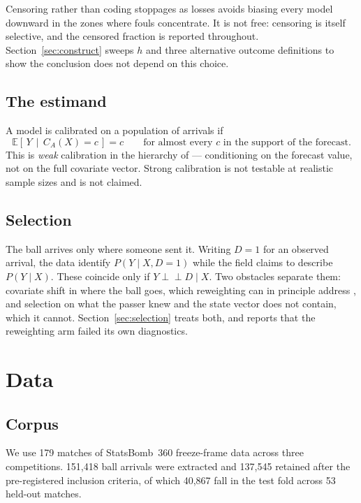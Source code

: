 \documentclass[11pt,a4paper]{article}
\begin{document}
Censoring rather than coding stoppages as losses avoids biasing every model
downward in the zones where fouls concentrate. It is not free: censoring is
itself selective, and the censored fraction is reported throughout.
Section~\ref{sec:construct} sweeps $h$ and three alternative outcome definitions
to show the conclusion does not depend on this choice.

\subsection{The estimand}

A model is calibrated on a population of arrivals if
\[
  \mathbb{E}\!\left[\,Y \,\middle|\, C_A(X) = c\,\right] = c
  \qquad\text{for almost every } c \text{ in the support of the forecast.}
\]
This is \emph{weak} calibration in the hierarchy of
\citet{vancalster2016hierarchy} --- conditioning on the forecast value, not on
the full covariate vector. Strong calibration is not testable at realistic sample
sizes and is not claimed.

\subsection{Selection}

The ball arrives only where someone sent it. Writing $D = 1$ for an observed
arrival, the data identify $P(Y \mid X, D = 1)$ while the field claims to
describe $P(Y \mid X)$. These coincide only if $Y \perp\!\!\!\perp D \mid X$. Two
obstacles separate them: covariate shift in where the ball goes, which
reweighting can in principle address \citep{horvitz1952generalization,
quinonero2009dataset}, and selection on what the passer knew and the state vector
does not contain, which it cannot. Section~\ref{sec:selection} treats both, and
reports that the reweighting arm failed its own diagnostics.

\section{Data}

\subsection{Corpus}

We use 179 matches of StatsBomb~360 freeze-frame data across three competitions.
151{,}418 ball arrivals were extracted and 137{,}545 retained after the
pre-registered inclusion criteria, of which 40{,}867 fall in the test fold across
53 held-out matches.
\end{document}
